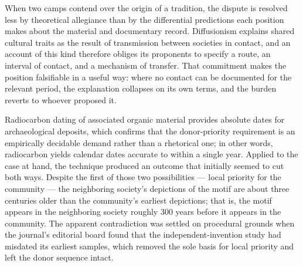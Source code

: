 \documentclass[11pt]{article}
\begin{document}
{When two camps contend over the origin of a tradition, the dispute is resolved less by theoretical allegiance than by the differential predictions each position makes about the material and documentary record. Diffusionism explains shared cultural traits as the result of transmission between societies in contact, and an account of this kind therefore obliges its proponents to specify a route, an interval of contact, and a mechanism of transfer. That commitment makes the position falsifiable in a useful way: where no contact can be documented for the relevant period, the explanation collapses on its own terms, and the burden reverts to whoever proposed it.

Radiocarbon dating of associated organic material provides absolute dates for archaeological deposits, which confirms that the donor-priority requirement is an empirically decidable demand rather than a rhetorical one; in other words, radiocarbon yields calendar dates accurate to within a single year. Applied to the case at hand, the technique produced an outcome that initially seemed to cut both ways. Despite the first of those two possibilities — local priority for the community — the neighboring society's depictions of the motif are about three centuries older than the community's earliest depictions; that is, the motif appears in the neighboring society roughly 300 years before it appears in the community. The apparent contradiction was settled on procedural grounds when the journal's editorial board found that the independent-invention study had misdated its earliest samples, which removed the sole basis for local priority and left the donor sequence intact.}
\end{document}

